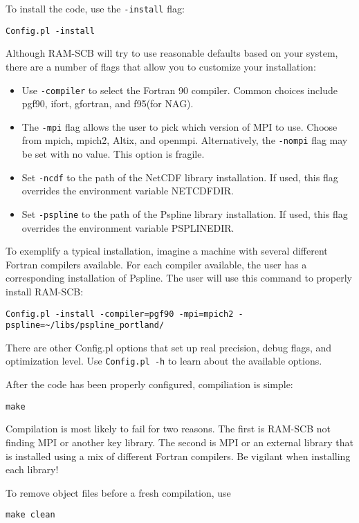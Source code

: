 To install the code, use the {\tt -install} flag:

\begin{verbatim}
Config.pl -install
\end{verbatim}


Although RAM-SCB will try to use reasonable defaults based on your system, 
there are a number of flags that allow you to customize your installation:
\begin{itemize}
\item{Use {\tt -compiler} to select the Fortran 90 compiler.  
  Common choices include pgf90, ifort, gfortran, and f95(for NAG).}
\item{The {\tt -mpi} flag allows the user to pick which version of MPI to use.
  Choose from mpich, mpich2, Altix, and openmpi.  Alternatively, the 
  {\tt -nompi} flag may be set with no value.  This option is fragile.}
\item{Set {\tt -ncdf} to the path of the NetCDF library installation.  
  If used, this flag overrides the environment variable NETCDFDIR.}
\item{Set {\tt -pspline} to the path of the Pspline library installation.  
  If used, this flag overrides the environment variable PSPLINEDIR.}
\end{itemize}

To exemplify a typical installation, imagine a machine with several different 
Fortran compilers available.  For each compiler available, the user has a 
corresponding installation of Pspline.  The user will use this command to 
properly install RAM-SCB:
\begin{verbatim}
Config.pl -install -compiler=pgf90 -mpi=mpich2 -pspline=~/libs/pspline_portland/
\end{verbatim}

There are other Config.pl options that set up real precision, debug flags, 
and optimization level.  Use {\tt Config.pl -h} to learn about the available 
options.

After the code has been properly configured, compiliation is simple:
\begin{verbatim}
make
\end{verbatim}

Compilation is most likely to fail for two reasons.  The first is RAM-SCB
not finding MPI or another key library.  The second is MPI or an external
library that is installed using a mix of different Fortran compilers.  Be
vigilant when installing each library!

To remove object files before a fresh compilation, use
\begin{verbatim}
make clean
\end{verbatim}

